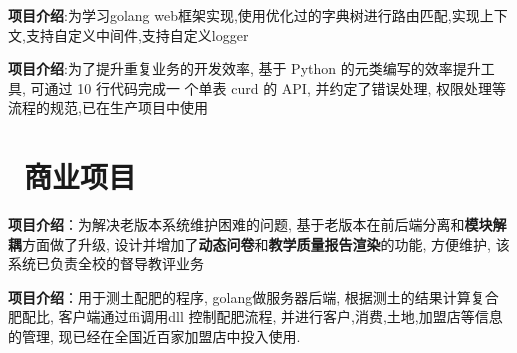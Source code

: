 \documentclass{resume}
\begin{document}
\begin{onehalfspacing}
  \textbf{项目介绍}:\quad 为学习golang web框架实现,使用优化过的字典树进行路由匹配,实现上下文,支持自定义中间件,支持自定义logger
\end{onehalfspacing}

\begin{onehalfspacing}
  \textbf{项目介绍}:\quad 为了提升重复业务的开发效率, 基于 Python 的元类编写的效率提升工具, 可通过 10 行代码完成一 个单表 curd 的 API, 并约定了错误处理, 权限处理等流程的规范,已在生产项目中使用
\end{onehalfspacing}

\section{\faUsers\ 商业项目}
\begin{onehalfspacing}
  \textbf{项目介绍}：\quad 为解决老版本系统维护困难的问题, 基于老版本在前后端分离和\textbf{模块解耦}方面做了升级, 设计并增加了\textbf{动态问卷}和\textbf{教学质量报告渲染}的功能, 方便维护, 该系统已负责全校的督导教评业务
\end{onehalfspacing}

\begin{onehalfspacing}
  \textbf{项目介绍}：\quad 用于测土配肥的程序, golang做服务器后端, 根据测土的结果计算复合肥配比, 客户端通过ffi调用dll 控制配肥流程,  并进行客户,消费,土地,加盟店等信息的管理, 现已经在全国近百家加盟店中投入使用.
\end{onehalfspacing}


%
%
\end{document}
